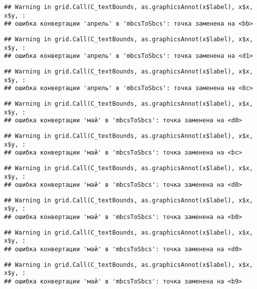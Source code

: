 \documentclass[
]{article}
\begin{document}
\begin{verbatim}
## Warning in grid.Call(C_textBounds, as.graphicsAnnot(x$label), x$x, x$y, :
## ошибка конвертации 'апрель' в 'mbcsToSbcs': точка заменена на <bb>
\end{verbatim}

\begin{verbatim}
## Warning in grid.Call(C_textBounds, as.graphicsAnnot(x$label), x$x, x$y, :
## ошибка конвертации 'апрель' в 'mbcsToSbcs': точка заменена на <d1>
\end{verbatim}

\begin{verbatim}
## Warning in grid.Call(C_textBounds, as.graphicsAnnot(x$label), x$x, x$y, :
## ошибка конвертации 'апрель' в 'mbcsToSbcs': точка заменена на <8c>
\end{verbatim}

\begin{verbatim}
## Warning in grid.Call(C_textBounds, as.graphicsAnnot(x$label), x$x, x$y, :
## ошибка конвертации 'май' в 'mbcsToSbcs': точка заменена на <d0>
\end{verbatim}

\begin{verbatim}
## Warning in grid.Call(C_textBounds, as.graphicsAnnot(x$label), x$x, x$y, :
## ошибка конвертации 'май' в 'mbcsToSbcs': точка заменена на <bc>
\end{verbatim}

\begin{verbatim}
## Warning in grid.Call(C_textBounds, as.graphicsAnnot(x$label), x$x, x$y, :
## ошибка конвертации 'май' в 'mbcsToSbcs': точка заменена на <d0>
\end{verbatim}

\begin{verbatim}
## Warning in grid.Call(C_textBounds, as.graphicsAnnot(x$label), x$x, x$y, :
## ошибка конвертации 'май' в 'mbcsToSbcs': точка заменена на <b0>
\end{verbatim}

\begin{verbatim}
## Warning in grid.Call(C_textBounds, as.graphicsAnnot(x$label), x$x, x$y, :
## ошибка конвертации 'май' в 'mbcsToSbcs': точка заменена на <d0>
\end{verbatim}

\begin{verbatim}
## Warning in grid.Call(C_textBounds, as.graphicsAnnot(x$label), x$x, x$y, :
## ошибка конвертации 'май' в 'mbcsToSbcs': точка заменена на <b9>
\end{verbatim}
\end{document}
